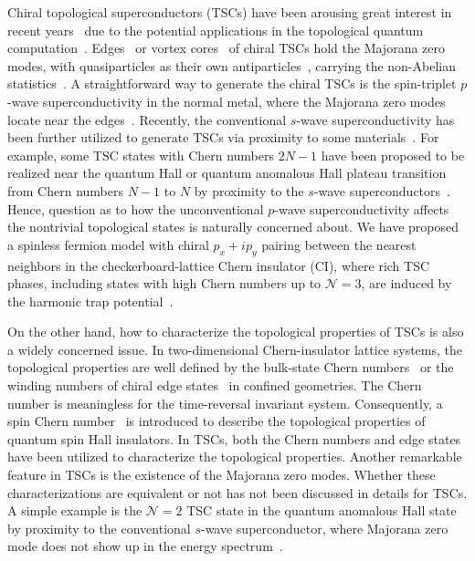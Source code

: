 \documentclass[12pt]{iopart}
\begin{document}
Chiral topological superconductors (TSCs) have been arousing great interest in recent years~\cite{Qi-RMP2011} due to the potential applications in the topological quantum computation~\cite{Tewari-PRL2007,Nayak-RMP2008,Alicea-RPP2012,Alicea-NP2011}. Edges~\cite{Alicea-RPP2012,Alicea-NP2011} or vortex cores~\cite{Jackiw-NPB1981,Volovik-JETP1999,Ivanov-PRL2001,SunHH-PRL2016} of chiral TSCs hold the Majorana zero modes, with quasiparticles as their own antiparticles~\cite{Majorana-Book2006,Wilczek-NP2009}, carrying the non-Abelian statistics~\cite{Ivanov-PRL2001}. A straightforward way to generate the chiral TSCs is the spin-triplet $p$-wave superconductivity in the normal metal, where the Majorana zero modes locate near the edges~\cite{Read-PRB2000,Kitaev-PU2001,Potter-PRL2010,Niu-PRB2012,Russo-PRB2013}. Recently, the conventional $s$-wave superconductivity has been further utilized to generate TSCs via proximity to some materials~\cite{Lutchyn-PRL2010,Oreg-PRL2010,Mourik-Science2012,Das-NP2012,Deng-NL2012,Nadj-Science2014,Lee-Science2014,Fu-PRL2008,Sau-PRL2010,Rokhinson-NP2012,Xu-PRL2015,SunHH-PRL2016}. For example, some TSC states with Chern numbers $2N-1$ have been proposed to be realized near the quantum Hall or quantum anomalous Hall plateau transition from Chern numbers $N-1$ to $N$ by proximity to the $s$-wave superconductors~\cite{Qi-PRB2010,Wang-PRB2015,Wang-PRB2016}. Hence, question as to how the unconventional $p$-wave superconductivity affects the nontrivial topological states is naturally concerned about. We have proposed a spinless fermion model with chiral $p_{x}+ip_{y}$ pairing between the nearest neighbors in the checkerboard-lattice Chern insulator (CI), where rich TSC phases, including states with high Chern numbers up to $\mathcal{N}=3$, are induced by the harmonic trap potential~\cite{Liu-SR2016}.

On the other hand, how to characterize the topological properties of TSCs is also a widely concerned issue. In two-dimensional Chern-insulator lattice systems, the topological properties are well defined by the bulk-state Chern numbers~\cite{Thouless-PRL1982} or the winding numbers of chiral edge states~\cite{Hatsugai-PRL1993} in confined geometries. The Chern number is meaningless for the time-reversal invariant system. Consequently, a spin Chern number~\cite{ShengL-PRL2005,ShengD-PRL2006,Prodan-PRB2009} is introduced to describe the topological properties of quantum spin Hall insulators. In TSCs, both the Chern numbers and edge states have been utilized to characterize the topological properties. Another remarkable feature in TSCs is the existence of the Majorana zero modes. Whether these characterizations are equivalent or not has not been discussed in details for TSCs. A simple example is the $\mathcal{N}=2$ TSC state in the quantum anomalous Hall state by proximity to the conventional $s$-wave superconductor, where Majorana zero mode does not show up in the energy spectrum~\cite{Qi-PRB2010}.
\end{document}
